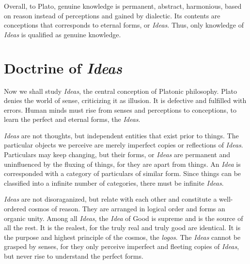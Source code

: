 \documentclass[11pt]{article}
\begin{document}
\begin{sloppypar}
\newline

Overall, to Plato, genuine knowledge is permanent, abstract, harmonious, based on reason instead of perceptions and gained by dialectic. 
Its contents are conceptions that corresponds to eternal forms, or \textit{Ideas}. 
Thus, only knowledge of \textit{Ideas} is qualified as genuine knowledge.
  

\section{Doctrine of \textit{Ideas}}
Now we shall study \textit{Ideas}, the central conception of Platonic philosophy. 
Plato denies the world of sense, criticizing it as illusion. 
It is defective and fulfilled with errors. 
Human minds must rise from senses and perceptions to conceptions, to learn the perfect and eternal forms, the \textit{Ideas}. 

\newline

\textit{Ideas} are not thoughts, but independent entities that exist prior to things. 
The particular objects we perceive are merely imperfect copies or reflections of \textit{Ideas}. 
Particulars may keep changing, but their forms, or \textit{Ideas} are permanent and uninfluenced by the fluxing of things, for they are apart from things. 
An \textit{Idea} is corresponded with a category of particulars of similar form. 
Since things can be classified into a infinite number of categories, there must be infinite \textit{Ideas}.

\newline

\textit{Ideas} are not disoraganized, but relate with each other and constitute a well-ordered cosmos of reason. 
They are arranged in logical order and forms an organic unity. 
Among all \textit{Ideas}, the \textit{Idea} of Good is supreme and is the source of all the rest. 
It is the realest, for the truly real and truly good are identical. 
It is the purpose and highest principle of the cosmos, the \textit{logos}. 
The \textit{Ideas} cannot be grasped by senses, for they only perceive imperfect and fleeting copies of \textit{Ideas}, but never rise to understand the perfect forms.

\newline


\end{sloppypar}
\end{document}
